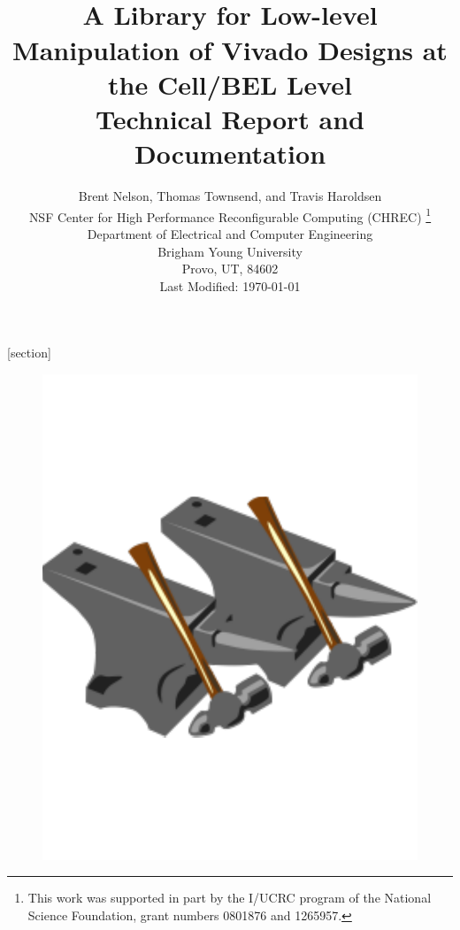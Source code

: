 \documentclass[10pt]{article}
\begin{document}
[section]

\date{}

\title{{\bf \Huge {}}\\[0.1in]
A Library for Low-level Manipulation 
of Vivado Designs at the Cell/BEL Level\\[0.3in]
Technical Report and Documentation\\[0.1in]
}
\author{\Large Brent Nelson, Thomas Townsend, and Travis Haroldsen\\[0.2in]
\large NSF Center for High Performance Reconfigurable Computing (CHREC) \thanks{This work was supported in part by the I/UCRC program of the National
 Science Foundation, grant numbers 0801876 and 1265957.}\\
\large Department of Electrical and Computer Engineering  \\
\large  Brigham Young University \\
\large  Provo, UT, 84602 \\[0.7in]
\large Last Modified: \today \\[0.05in]
}


\maketitle
\begin{figure}[H]
\centering
\includegraphics[width=0.4\columnwidth]{logo}
\end{figure}

\newpage
\tableofcontents















\appendix




\end{document}
